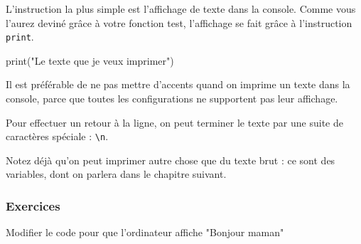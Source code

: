 L'instruction la plus simple est l'affichage de texte dans la console. Comme vous l'aurez deviné grâce à votre fonction test, l'affichage se fait grâce à l'instruction \texttt{print}.

\begin{python}
print("Le texte que je veux imprimer")
\end{python}

Il est préférable de ne pas mettre d'accents quand on imprime un texte dans la console, parce que toutes les configurations ne supportent pas leur affichage.

Pour effectuer un retour à la ligne, on peut terminer le texte par une suite de caractères spéciale : \lstinline{\n}.

Notez déjà qu'on peut imprimer autre chose que du texte brut : ce sont des variables, dont on parlera dans le chapitre suivant.
\subsubsection{Exercices}
    Modifier le code pour que l'ordinateur affiche "Bonjour maman"